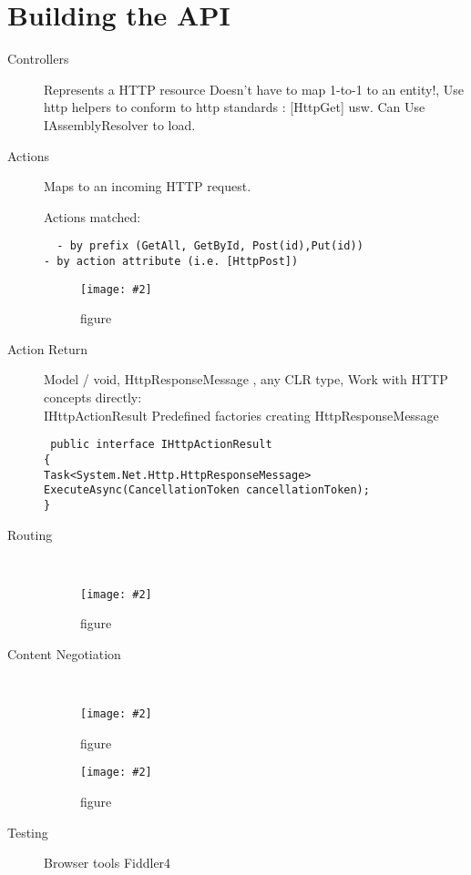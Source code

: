 \documentclass[a4paper,10pt]{scrreprt}
\newcommand{\pic}[2][figure]{\begin{figure}[h]
 \centering
 \texttt{[image: \#2]}
 \caption{#1}
\end{figure}
}
\begin{document}
\section{Building the API}
\begin{description}
 \item [Controllers] Represents a HTTP resource  Doesn’t have to map 1-to-1 to an entity!, Use http helpers to conform 
to http standards : [HttpGet] usw. Can Use IAssemblyResolver to load.
\item [Actions] Maps to an incoming HTTP request. \\
\begin{framed}
 Actions matched:\\
 \begin{verbatim}
  - by prefix (GetAll, GetById, Post(id),Put(id))
- by action attribute (i.e. [HttpPost]) 
 \end{verbatim}
\end{framed}
\pic{acpa.png}
\item[Action Return]Model / void, HttpResponseMessage , any CLR type, Work with HTTP concepts directly:\\
IHttpActionResult Predefined factories creating HttpResponseMessage\\
\begin{verbatim}
 public interface IHttpActionResult
{
Task<System.Net.Http.HttpResponseMessage> ExecuteAsync(CancellationToken cancellationToken);
}
\end{verbatim}
\item[Routing] \hfill \\
\pic{routing.png}
\item[Content Negotiation] \hfill \\
\pic{cn.png}
\pic{cn2.png}
\item[Testing] Browser tools Fiddler4

\end{description}
\end{document}
